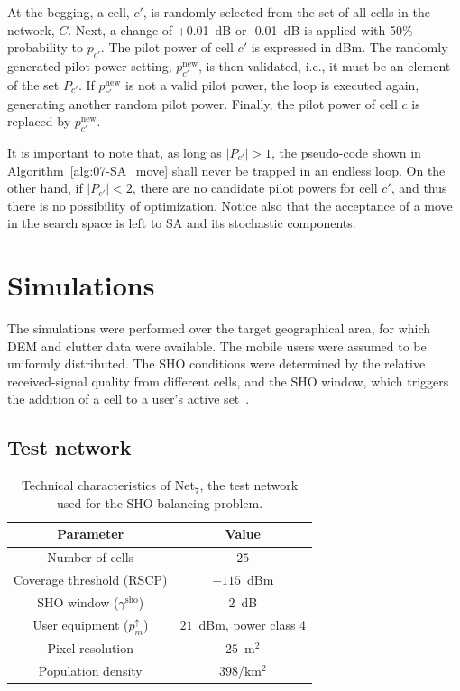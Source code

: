 At the begging, a cell, $c'$, is randomly selected from the set of
all cells in the network, $C$. Next, a change of +0.01~dB or -0.01~dB
is applied with 50\% probability to $p_{c'}$. The pilot power of
cell $c'$ is expressed in dBm. The randomly generated pilot-power
setting, $p_{c'}^{\mathrm{new}}$, is then validated, i.e., it must
be an element of the set $P_{c'}$. If $p_{c'}^{\mathrm{new}}$ is
not a valid pilot power, the loop is executed again, generating another
random pilot power. Finally, the pilot power of cell $c$ is replaced
by $p_{c'}^{\mathrm{new}}$.

It is important to note that, as long as $|P_{c'}|>1$, the pseudo-code
shown in Algorithm~\ref{alg:07-SA_move} shall never be trapped in
an endless loop. On the other hand, if $|P_{c'}|<2$, there are no
candidate pilot powers for cell $c'$, and thus there is no possibility
of optimization. Notice also that the acceptance of a move in the
search space is left to SA and its stochastic components.


\section{Simulations \label{sec:07-Simulations}}

The simulations were performed over the target geographical area,
for which DEM and clutter data were available. The mobile users were
assumed to be uniformly distributed. The SHO conditions were determined
by the relative received-signal quality from different cells, and
the SHO window, which triggers the addition of a cell to a user's
active set~\cite{WCDMAforUMTS_RadioAccessForThirdGenerationMobileCommunications}.


\subsection{Test network}

\begin{table}
\caption{Technical characteristics of Net$_{7}$, the test network used for
the SHO-balancing problem. \label{tab:07-Test_network_properties}}


\centering

\begin{tabular}{cc}
\hline 
Parameter & Value\tabularnewline
\hline 
Number of cells & $25$\tabularnewline
Coverage threshold (RSCP) & $-115$~dBm\tabularnewline
SHO window ($\gamma^{\mathrm{sho}}$) & $2$~dB\tabularnewline
User equipment ($p_{m}^{\uparrow}$) & $21$~dBm, power class 4\tabularnewline
Pixel resolution & $25$~m$^{2}$\tabularnewline
Population density & $398$/km$^{2}$\tabularnewline
\hline 
\end{tabular}
\end{table}


